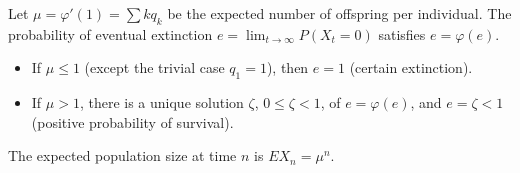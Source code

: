 Let $\mu = \varphi'(1) = \sum k q_k$ be the expected number of offspring per individual. The probability of eventual extinction $e = \lim_{t \to \infty} P(X_t = 0)$ satisfies $e = \varphi(e)$.

\begin{itemize}
\item If $\mu \leq 1$ (except the trivial case $q_1 = 1$), then $e = 1$ (certain extinction).
\item If $\mu > 1$, there is a unique solution $\zeta$, $0 \leq \zeta < 1$, of $e = \varphi(e)$, and $e = \zeta < 1$ (positive probability of survival).
\end{itemize}

The expected population size at time $n$ is $EX_n = \mu^n$.
